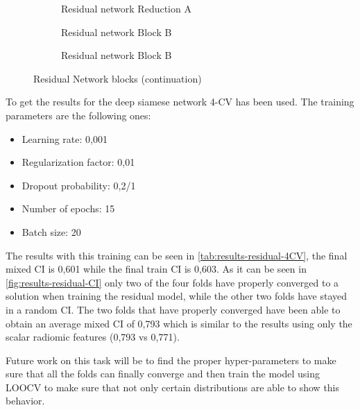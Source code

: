 \begin{figure}\ContinuedFloat
  \begin{subfigure}[b]{.55\textwidth}
    \centering
    \scalebox{.85}{}
    \caption{Residual network Reduction A \label{fig:residual-block-reduce-a}}
  \end{subfigure}
  \begin{subfigure}[b]{.44\textwidth}
    \centering
    \scalebox{.85}{}
    \caption{Residual network Block B \label{fig:residual-block-b}}
  \end{subfigure}

  \begin{subfigure}[b]{\textwidth}
    \centering
    \scalebox{.9}{}
    \caption{Residual network Block B \label{fig:residual-block-reduce-b}}
  \end{subfigure}
  \caption{Residual Network blocks (continuation)}
\end{figure}


To get the results for the deep siamese network 4-\gls{CV} has been used. The training
parameters are the following ones:
\begin{itemize}
  \item Learning rate: 0,001
  \item Regularization factor: 0,01
  \item Dropout probability: 0,2/1
  \item Number of epochs: 15
  \item Batch size: 20
\end{itemize}

The results with this training can be seen in \autoref{tab:results-residual-4CV}, the final
mixed \gls{CI} is 0,601 while the final train \gls{CI} is 0,603.
As it can be seen in \autoref{fig:results-residual-CI} only two of the four folds have 
properly converged to a solution when training the residual model, while the other two folds
have stayed in a random \gls{CI}. The two folds that have properly converged have been able
to obtain an average mixed \gls{CI} of 0,793 which is similar to the results using only
the scalar radiomic features (0,793 vs 0,771).

Future work on this task will be to find the proper hyper-parameters to make sure that all
the folds can finally converge and then train the model using \gls{LOOCV} to make sure
that not only certain distributions are able to show this behavior.

